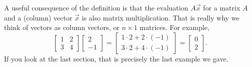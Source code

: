 A useful consequence of the definition is that the evaluation
$A \vec{x}$ for a matrix $A$
and a (column) vector $\vec{x}$ is also matrix multiplication.
That is really why we think of
vectors as column vectors, or $n \times 1$ matrices.
For example,
\begin{equation*}
\begin{bmatrix}
1 & 2 \\ 3 & 4
\end{bmatrix}
\begin{bmatrix}
2 \\ -1
\end{bmatrix}
=
\begin{bmatrix}
1 \cdot 2 + 2 \cdot (-1) \\
3 \cdot 2 + 4 \cdot (-1)
\end{bmatrix}
=
\begin{bmatrix}
0 \\ 2
\end{bmatrix}  .
\end{equation*}
If you look at the last section, that is precisely the last
example we gave.

